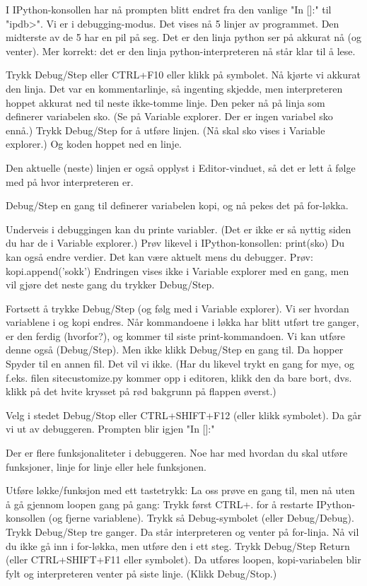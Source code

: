 I IPython-konsollen har nå prompten blitt endret fra den vanlige "In []:" til "ipdb>".
Vi er i debugging-modus. 
Det vises nå 5 linjer av programmet. Den midterste av de 5 har en pil på seg.
Det er den linja python ser på akkurat nå (og venter).
Mer korrekt: det er den linja python-interpreteren nå står klar til å lese. 

Trykk Debug/Step eller CTRL+F10 eller klikk på symbolet.
Nå kjørte vi akkurat den linja.
Det var en kommentarlinje, så ingenting skjedde, men interpreteren hoppet akkurat
ned til neste ikke-tomme linje.
Den peker nå på linja som definerer variabelen sko.
(Se på Variable explorer. Der er ingen variabel sko ennå.) 
Trykk Debug/Step for å utføre linjen.
(Nå skal sko vises i Variable explorer.)
Og koden hoppet ned en linje.

Den aktuelle (neste) linjen er også opplyst i Editor-vinduet,
så det er lett å følge med på hvor interpreteren er. 

Debug/Step en gang til definerer variabelen kopi,
og nå pekes det på for-løkka.

Underveis i debuggingen kan du printe variabler. 
(Det er ikke er så nyttig siden du har de i Variable explorer.)
Prøv likevel i IPython-konsollen:
print(sko)
Du kan også endre verdier. Det kan være aktuelt mens du debugger. 
Prøv:
kopi.append('sokk')
Endringen vises ikke i Variable explorer med en gang,
men vil gjøre det neste gang du trykker Debug/Step. 


Fortsett å trykke Debug/Step (og følg med i Variable explorer).
Vi ser hvordan variablene i og kopi endres.
Når kommandoene i løkka har blitt utført tre ganger, er den ferdig (hvorfor?),
og kommer til siste print-kommandoen.
Vi kan utføre denne også (Debug/Step).
Men ikke klikk Debug/Step en gang til. Da hopper Spyder til en annen fil.
Det vil vi ikke.
(Har du likevel trykt en gang for mye, og f.eks. filen sitecustomize.py
kommer opp i editoren, klikk den da bare bort, dvs. klikk på det hvite
krysset på rød bakgrunn på flappen øverst.)

Velg i stedet Debug/Stop eller CTRL+SHIFT+F12 (eller klikk symbolet).
Da går vi ut av debuggeren.
Prompten blir igjen "In []:"


Der er flere funksjonaliteter i debuggeren.
Noe har med hvordan du skal utføre funksjoner, linje for linje eller hele funksjonen.


Utføre løkke/funksjon med ett tastetrykk: 
La oss prøve en gang til, men nå uten å gå gjennom loopen gang på gang:
Trykk først CTRL+. for å restarte IPython-konsollen (og fjerne variablene).
Trykk så Debug-symbolet (eller Debug/Debug).
Trykk Debug/Step tre ganger.
Da står interpreteren og venter på for-linja. 
Nå vil du ikke gå inn i for-løkka, men utføre den i ett steg.
Trykk Debug/Step Return (eller CTRL+SHIFT+F11 eller symbolet).
Da utføres loopen, kopi-variabelen blir fylt og interpreteren venter på siste linje.
(Klikk Debug/Stop.)


